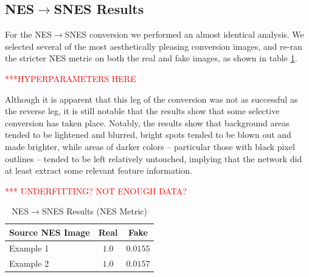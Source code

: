 \documentclass[10pt,twocolumn,letterpaper]{article}
\begin{document}
\subsection{NES$\rightarrow$SNES Results}

For the NES$\rightarrow$SNES conversion we performed an almost identical analysis. We selected several of the most aesthetically pleasing conversion images, and re-ran the stricter NES metric on both the real and fake images, as shown in table \ref{tab:snesresults}. 

\textcolor{red}{***HYPERPARAMETERS HERE}

Although it is apparent that this leg of the conversion was not as successful as the reverse leg, it is still notable that the results show that some selective conversion has taken place. Notably, the results show that background areas tended to be lightened and blurred, bright spots tended to be blown out and made brighter, while areas of darker colors \--- particular those with black pixel outlines \--- tended to be left relatively untouched, implying that the network did at least extract some relevant feature information. 

\textcolor{red}{*** UNDERFITTING? NOT ENOUGH DATA?}

\begin{table}
   \begin{center}
      \begin{tabular}{|l|c|c|}
         \hline
         Source NES Image & Real  & Fake           \\
         \hline\hline
         Example 1 & $1.0$  & $0.0155$           \\
         Example 2  & $1.0$ & $0.0157$           \\
         \hline
      \end{tabular}
   \end{center}
   \caption{NES$\rightarrow$SNES Results (NES Metric)}
   \label{tab:snesresults}
\end{table}
\end{document}
